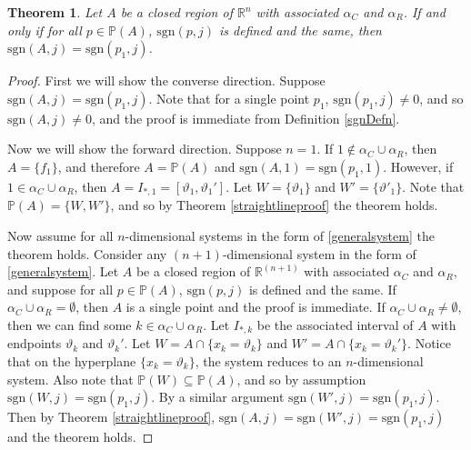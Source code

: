 \documentclass[12pt]{article}
\newtheorem{theorem}{Theorem}[section]
\theoremstyle{definition}
\theoremstyle{remark}
\newcommand\sgn{\text{sgn}}
\newcommand{\bbR}{\mathbb{R}} %
\newcommand{\bbP}{\mathbb{P}}
\begin{document}
\begin{theorem} \label{cornerpointproof}
Let $A$ be a closed region of $\bbR^n$ with associated $\alpha_C$ and $\alpha_R$. If and only if for all $p\in\bbP(A)$, $\sgn(p,j)$ is defined and the same, then $\sgn(A,j)=\sgn(p_1,j)$.
\end{theorem}

\begin{proof}
First we will show the converse direction. Suppose $\sgn(A,j)=\sgn(p_1,j)$. Note that for a single point $p_1$, $\sgn(p_1,j)\neq 0$, and so $\sgn(A,j)\neq 0$, and the proof is immediate from Definition \ref{sgnDefn}.

Now we will show the forward direction. Suppose $n=1$. If $1\notin \alpha_C \cup \alpha_R$, then $A=\{f_1\}$, and therefore $A=\bbP(A)$ and $\sgn(A,1)=\sgn(p_1,1)$. However, if $1\in \alpha_C \cup \alpha_R$, then $A=I_{*,1}=[\vartheta_1,\vartheta_1']$. Let $W=\{\vartheta_1\}$ and $W'=\{\vartheta'_1\}$. Note that $\bbP(A)=\{W,W'\}$, and so by Theorem \ref{straightlineproof} the theorem holds.

Now assume for all $n$-dimensional systems in the form of \eqref{generalsystem} the theorem holds. Consider any $(n+1)$-dimensional system in the form of \eqref{generalsystem}. Let $A$ be a closed region of $\bbR^{(n+1)}$ with associated $\alpha_C$ and $\alpha_R$, and suppose for all $p\in\bbP(A)$, $\sgn(p,j)$ is defined and the same. If $\alpha_C \cup \alpha_R=\emptyset$, then $A$ is a single point and the proof is immediate. If $\alpha_C \cup \alpha_R \neq \emptyset$, then we can find some $k\in \alpha_C \cup \alpha_R$. Let $I_{*,k}$ be the associated interval of $A$ with endpoints $\vartheta_k$ and $\vartheta_k'$. Let $W=A \cap \{x_k=\vartheta_k\}$ and $W'=A \cap \{x_k=\vartheta_k'\}$. Notice that on the hyperplane $\{x_k=\vartheta_k\}$, the system reduces to an $n$-dimensional system. Also note that $\bbP(W)\subseteq\bbP(A)$, and so by assumption $\sgn(W,j)=\sgn(p_1,j)$. By a similar argument $\sgn(W',j)=\sgn(p_1,j)$. Then by Theorem \ref{straightlineproof}, $\sgn(A,j)=\sgn(W',j)=\sgn(p_1,j)$ and the theorem holds. 
\end{proof} 
\end{document}
